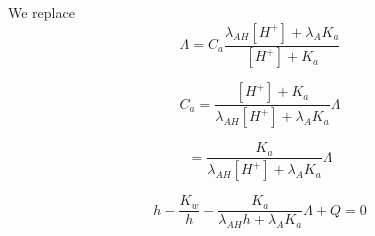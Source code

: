 \documentclass[aps,12pt]{revtex4}
\begin{document}
We replace
\begin{equation}
	\Lambda = C_a \dfrac{\lambda_{AH} [H^+] + \lambda_{A} K_a}{[H^+]+K_a}
\end{equation}

\begin{equation}
	C_a = \dfrac{[H^+]+K_a}{\lambda_{AH} [H^+] + \lambda_{A} K_a} \Lambda
\end{equation}

\begin{equation}
	[A^-] = \dfrac{K_a}{\lambda_{AH} [H^+] + \lambda_{A} K_a} \Lambda
\end{equation}

\begin{equation}
	h - \dfrac{K_w}{h} - \dfrac{K_a}{\lambda_{AH} h + \lambda_{A} K_a} \Lambda + Q = 0
\end{equation}
\end{document}
